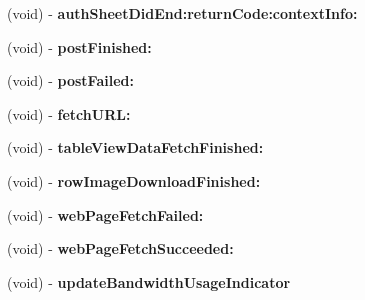 \begin{DoxyCompactItemize}
\item 
\hypertarget{interface_app_delegate_07_08_a4105cf0e53153c648732d346a3d36a4f}{
(void) -\/ {\bfseries auth\-Sheet\-Did\-End\-:return\-Code\-:context\-Info\-:}}
\label{interface_app_delegate_07_08_a4105cf0e53153c648732d346a3d36a4f}

\item 
\hypertarget{interface_app_delegate_07_08_ac85d1ef9bdb254c0fe788fe536d6d5fe}{
(void) -\/ {\bfseries post\-Finished\-:}}
\label{interface_app_delegate_07_08_ac85d1ef9bdb254c0fe788fe536d6d5fe}

\item 
\hypertarget{interface_app_delegate_07_08_a75c2c2f337b6b7c499fd504bedc6cab8}{
(void) -\/ {\bfseries post\-Failed\-:}}
\label{interface_app_delegate_07_08_a75c2c2f337b6b7c499fd504bedc6cab8}

\item 
\hypertarget{interface_app_delegate_07_08_a4bf047dd192c26f94681048c15b2623f}{
(void) -\/ {\bfseries fetch\-U\-R\-L\-:}}
\label{interface_app_delegate_07_08_a4bf047dd192c26f94681048c15b2623f}

\item 
\hypertarget{interface_app_delegate_07_08_af9480a3ce0a0cb0f6c04e3cf9de252ea}{
(void) -\/ {\bfseries table\-View\-Data\-Fetch\-Finished\-:}}
\label{interface_app_delegate_07_08_af9480a3ce0a0cb0f6c04e3cf9de252ea}

\item 
\hypertarget{interface_app_delegate_07_08_ac7cd855f8dca00fb2f04edf71c42bfaa}{
(void) -\/ {\bfseries row\-Image\-Download\-Finished\-:}}
\label{interface_app_delegate_07_08_ac7cd855f8dca00fb2f04edf71c42bfaa}

\item 
\hypertarget{interface_app_delegate_07_08_a2359a2b308d2b5e78aa06bc7bf880b7c}{
(void) -\/ {\bfseries web\-Page\-Fetch\-Failed\-:}}
\label{interface_app_delegate_07_08_a2359a2b308d2b5e78aa06bc7bf880b7c}

\item 
\hypertarget{interface_app_delegate_07_08_a80920eddc398708c2cafa6a6fd6ee446}{
(void) -\/ {\bfseries web\-Page\-Fetch\-Succeeded\-:}}
\label{interface_app_delegate_07_08_a80920eddc398708c2cafa6a6fd6ee446}

\item 
\hypertarget{interface_app_delegate_07_08_a74fe7eb4eb69838d205c611f52b6326e}{
(void) -\/ {\bfseries update\-Bandwidth\-Usage\-Indicator}}
\label{interface_app_delegate_07_08_a74fe7eb4eb69838d205c611f52b6326e}


\end{DoxyCompactItemize}

